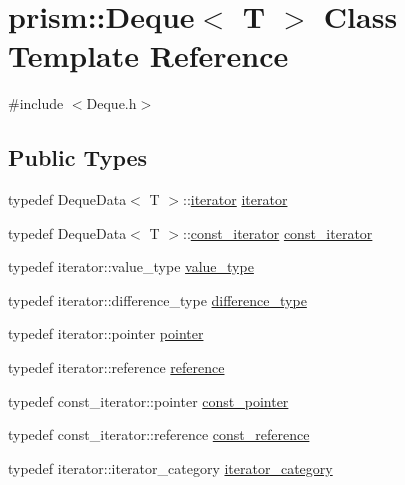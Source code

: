 \hypertarget{classprism_1_1_deque}{}\section{prism\+:\+:Deque$<$ T $>$ Class Template Reference}
\label{classprism_1_1_deque}


{\ttfamily \#include $<$Deque.\+h$>$}

\subsection*{Public Types}
\begin{DoxyCompactItemize}
\item 
typedef Deque\+Data$<$ T $>$\+::\hyperlink{classprism_1_1_deque_af6fbdfa6e826f7f71b29f4d3cfb72ed1}{iterator} \hyperlink{classprism_1_1_deque_af6fbdfa6e826f7f71b29f4d3cfb72ed1}{iterator}
\item 
typedef Deque\+Data$<$ T $>$\+::\hyperlink{classprism_1_1_deque_afc2f71fd5b01e963e093f64cc4da94ec}{const\+\_\+iterator} \hyperlink{classprism_1_1_deque_afc2f71fd5b01e963e093f64cc4da94ec}{const\+\_\+iterator}
\item 
typedef iterator\+::value\+\_\+type \hyperlink{classprism_1_1_deque_ab14234d70c36a687014d59a5569863c7}{value\+\_\+type}
\item 
typedef iterator\+::difference\+\_\+type \hyperlink{classprism_1_1_deque_a2639a05f15b2d1748258ceb9f6e5c8c3}{difference\+\_\+type}
\item 
typedef iterator\+::pointer \hyperlink{classprism_1_1_deque_a9cff677f1cdffd6f9900a84fd0fa7b17}{pointer}
\item 
typedef iterator\+::reference \hyperlink{classprism_1_1_deque_a93d8792e719ca205ce1b9ed5d8207c1d}{reference}
\item 
typedef const\+\_\+iterator\+::pointer \hyperlink{classprism_1_1_deque_a4c43189271514578fda69c968b1d4e3c}{const\+\_\+pointer}
\item 
typedef const\+\_\+iterator\+::reference \hyperlink{classprism_1_1_deque_a8fcabfe6976606b91b4abef0e0353584}{const\+\_\+reference}
\item 
typedef iterator\+::iterator\+\_\+category \hyperlink{classprism_1_1_deque_a5a8e5c9e68bc92b45fcf5b1dcae7418b}{iterator\+\_\+category}
\end{DoxyCompactItemize}
